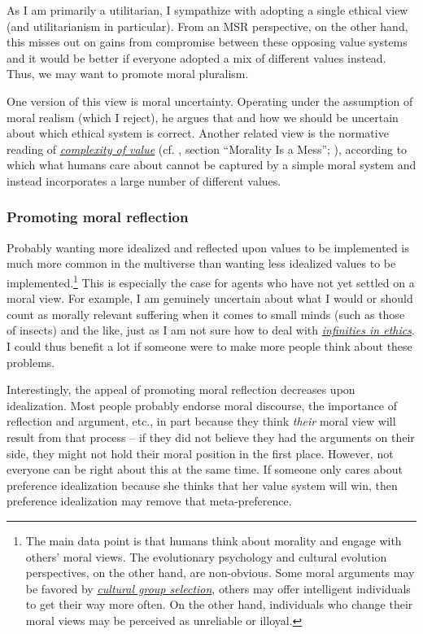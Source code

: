 As I am primarily a utilitarian, I sympathize with adopting a single
ethical view (and utilitarianism in particular). From an MSR
perspective, on the other hand, this misses out on gains from compromise
between these opposing value systems and it would be better if everyone
adopted a mix of different values instead. Thus, we may want to promote
moral pluralism.

One version of this view is \parencite{MacAskill2014-ca}
moral uncertainty. Operating under the assumption of moral realism
(which I reject), he argues that and how we should be uncertain about
which ethical system is correct. Another related view is the normative
reading of \parencite{Yudkowsky2011-ux}
\href{https://wiki.lesswrong.com/wiki/Complexity_of_value}{\emph{complexity
of value}} (cf. \parencite{Stewart-Williams2015-gg}, section
``Morality Is a Mess''; \parencite{Muehlhauser2012-ib}),
according to which what humans care about cannot be captured by a simple
moral system and instead incorporates a large number of different
values.

\subsubsection{Promoting moral
reflection}\label{promoting-moral-reflection}

Probably wanting more idealized and reflected upon values to be
implemented is much more common in the multiverse than wanting less
idealized values to be implemented.\footnote{The main data point is that
  humans think about morality and engage with others' moral views. The
  evolutionary psychology and cultural evolution perspectives, on the
  other hand, are non-obvious. Some moral arguments may be favored by
  \href{https://en.wikipedia.org/wiki/Cultural_group_selection}{\emph{cultural
  group selection}}, others may offer intelligent individuals to get
  their way more often. On the other hand, individuals who change their
  moral views may be perceived as unreliable or illoyal.} This is
especially the case for agents who have not yet settled on a moral view.
For example, I am genuinely uncertain about what I would or should count
as morally relevant suffering when it comes to small minds (such as
those of insects) and the like, just as I am not sure how to deal with
\href{https://foundational-research.org/infinity-in-ethics/}{\emph{infinities
in ethics}}. I could thus benefit a lot if someone were to make more
people think about these problems.

Interestingly, the appeal of promoting moral reflection decreases upon
idealization. Most people probably endorse moral discourse, the
importance of reflection and argument, etc., in part because they think
\emph{their} moral view will result from that process -- if they did not
believe they had the arguments on their side, they might not hold their
moral position in the first place. However, not everyone can be right
about this at the same time. If someone only cares about preference
idealization because she thinks that her value system will win, then
preference idealization may remove that meta-preference.

